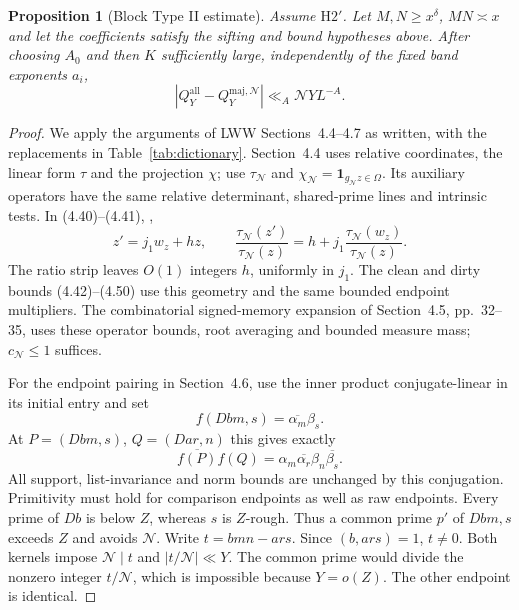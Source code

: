 \documentclass[11pt]{article}
\newtheorem{proposition}[theorem]{Proposition}
\theoremstyle{definition}
\newcommand{\ind}{\mathbf 1}
\newcommand{\GN}{\mathcal N}
\newcommand{\QQ}{Q_Y^{\mathrm{all}}}
\newcommand{\Qmaj}{Q_Y^{\mathrm{maj},\GN}}
\newcommand{\tauN}{\tau_{\GN}}
\newcommand{\gN}{g_{\GN}}
\newcommand{\LWW}[1]{\cite[#1]{LWW}}
\theoremstyle{remark}
\numberwithin{equation}{section}
\begin{document}
\begin{proposition}[Block Type II estimate]\label{prop:II}
Assume $\mathrm H2'$. Let $M,N\ge x^\delta$, $MN\asymp x$ and
let the coefficients satisfy the sifting and bound hypotheses above.
After choosing $A_0$ and then $K$ sufficiently large, independently
of the fixed band exponents $a_i$,
\begin{equation}\label{eq:II}
 |\QQ-\Qmaj|\ll_A\GN YL^{-A}.
\end{equation}
\end{proposition}
\begin{proof}
We apply the arguments of LWW Sections~4.4--4.7 as written, with
the replacements in Table~\ref{tab:dictionary}.
Section~4.4 uses relative coordinates, the linear form $\tau$ and
the projection $\chi$; use $\tauN$ and
$\chi_{\GN}=\ind_{\gN z\in\Omega}$.
Its auxiliary operators have the same relative determinant,
shared-prime lines and intrinsic tests. In (4.40)--(4.41),
\LWW{pp.~27--28},
\begin{equation}\label{eq:bezout-edge}
 z'=j_1w_z+hz,\qquad
 \frac{\tauN(z')}{\tauN(z)}
     =h+j_1\frac{\tauN(w_z)}{\tauN(z)}.
\end{equation}
The ratio strip leaves $O(1)$ integers $h$, uniformly in $j_1$.
The clean and dirty bounds (4.42)--(4.50) use this geometry and the
same bounded endpoint multipliers.
The combinatorial signed-memory expansion of Section~4.5,
pp.~32--35, uses these operator bounds, root averaging and bounded
measure mass; $c_{\GN}\le1$ suffices.

For the endpoint pairing in Section~4.6, use the inner product
conjugate-linear in its initial entry and set
\begin{equation}\label{eq:endpoint-conjugation}
 f(Db m,s)=\overline{\alpha_m}\beta_s.
\end{equation}
At $P=(Dbm,s)$, $Q=(Dar,n)$ this gives exactly
\begin{equation}\label{eq:pairing-product}
 \overline{f(P)}f(Q)
 =\alpha_m\overline{\alpha_r}\beta_n\overline{\beta_s}.
\end{equation}
All support, list-invariance and norm bounds are unchanged by this
conjugation. Primitivity must hold for comparison endpoints as well
as raw endpoints. Every prime of $Db$ is below $Z$, whereas $s$ is
$Z$-rough. Thus a common prime $p'$ of $Dbm,s$ exceeds $Z$ and
avoids $\GN$. Write $t=bmn-ars$. Since $(b,ars)=1$, $t\ne0$.
Both kernels impose $\GN\mid t$ and $|t/\GN|\ll Y$.
The common prime would divide the nonzero integer $t/\GN$, which
is impossible because $Y=o(Z)$. The other endpoint is identical.


\end{proof}
\end{document}

